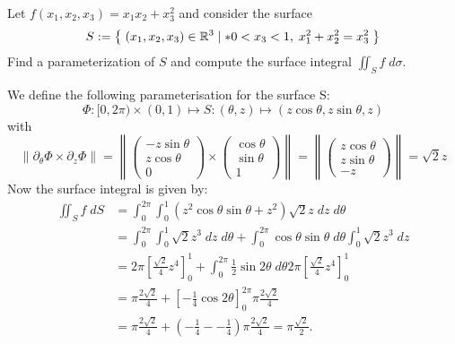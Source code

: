 \documentclass[11pt]{article}
\begin{document}
\begin{exercise}
    Let $f(x_1,x_2,x_3) = x_1 x_2 + x_3^2$ and consider the surface 
    \begin{gather*}
        S := \left\{ \; (x_1,x_2,x_3) \in \mathbb R^3 \suchthat* 0 < x_3 < 1, \; x_1^2 + x_2^2 = x_3^2 \;  \right\}
    \end{gather*}
    Find a parameterization of $S$ and compute the surface integral $\iint_S f \;d\sigma$. 
\end{exercise}
\begin{solution}
    We define the following parameterisation for the surface S:
    \[
    \Phi: [0,2\pi) \times (0,1) \mapsto S: (\theta,z)\mapsto (z\cos\theta, z\sin\theta,z)
    \]
    with
    \[
        \left\|\partial_{\theta}\Phi\times \partial_z\Phi\right\|  
        = 
        \left\|\begin{pmatrix} -z\sin\theta \\ z\cos\theta\\0 \end{pmatrix} \times \begin{pmatrix} \cos\theta \\ \sin\theta \\1 \end{pmatrix}\right\|
        = 
        \left\|\begin{pmatrix} z\cos\theta \\ z\sin\theta \\ -z \end{pmatrix}\right\| 
        = 
        \sqrt{2}z
    \]
    Now the surface integral is given by:
    \begin{align*}
        \iint_{S} f \;d S
        &
        = \int_0^{2\pi} \int_0^1 \left(z^2\cos\theta \sin\theta + z^2 \right)\sqrt{2}z\;d z \;d \theta
        \\&
        = \int_0^{2\pi} \int_0^1\sqrt{2}z^{3} \;d z \;d \theta + \int_0^{2\pi} \cos\theta \sin\theta \;d \theta \int_0^1  \sqrt{2}z^{3}\;d z 
        \\&
        =
        2\pi \left[\frac{\sqrt{2}}{4} z^{4}\right]_0^{1} + \int_0^{2\pi} \frac{1}{2}\sin2\theta \;d \theta 2\pi \left[\frac{\sqrt{2}}{4} z^{4}\right]_0^{1}
        \\&
        =
        \pi \frac{2\sqrt{2}}{4}+ \left[-\frac{1}{4}\cos2\theta\right]_{0}^{2\pi} \pi \frac{2\sqrt{2}}{4} 
        \\&
        = 
        \pi \frac{2\sqrt{2}}{4}+ \left(-\frac{1}{4} -  - \frac{1}{4}\right) \pi\frac{2\sqrt{2}}{4}
        = 
        \pi\frac{\sqrt{2}}{2}
        .
    \end{align*}
\end{solution}
\end{document}
